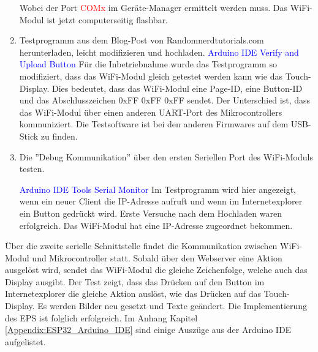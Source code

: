 \begin{enumerate}
Wobei der Port \textcolor{red}{COMx} im Geräte-Manager ermittelt werden muss. Das WiFi-Modul ist jetzt computerseitig flashbar.\newpage

\item Testprogramm aus dem Blog-Post von Randomnerdtutorials.com herunterladen, leicht modifizieren und hochladen. \cite{santos_esp32_2018}\newline
\textcolor{blue}{Arduino IDE \textrightarrow Verify and Upload Button} \newline
Für die Inbetriebnahme wurde das Testprogramm so modifiziert, dass das WiFi-Modul gleich getestet werden kann wie das Touch-Display. Dies bedeutet, dass das WiFi-Modul eine Page-ID, eine Button-ID und das Abschlusszeichen 0xFF 0xFF 0xFF sendet. Der Unterschied ist, dass das WiFi-Modul über einen anderen UART-Port des Mikrocontrollers kommuniziert. Die Testsoftware ist bei den anderen Firmwares auf dem USB-Stick zu finden.\newline

\item Die ''Debug Kommunikation'' über den ersten Seriellen Port des WiFi-Moduls testen.

\textcolor{blue}{Arduino IDE \textrightarrow Tools \textrightarrow Serial Monitor}\newline
Im Testprogramm wird hier angezeigt, wenn ein neuer Client die IP-Adresse aufruft und wenn im Internetexplorer ein Button gedrückt wird. Erste Versuche nach dem Hochladen waren erfolgreich. Das WiFi-Modul hat eine IP-Adresse zugeordnet bekommen.
\end{enumerate}

Über die zweite serielle Schnittstelle findet die Kommunikation zwischen WiFi-Modul und Mikrocontroller statt. Sobald über den Webserver eine Aktion ausgelöst wird, sendet das WiFi-Modul die gleiche Zeichenfolge, welche auch das Display ausgibt. Der Test zeigt, dass das Drücken auf den Button im Internetexplorer die gleiche Aktion auslöst, wie das Drücken auf das Touch-Display. Es werden Bilder neu gesetzt und Texte geändert. Die Implementierung des EPS ist folglich erfolgreich. Im Anhang Kapitel \ref{Appendix:ESP32_Arduino_IDE} sind einige Auszüge aus der Arduino IDE aufgelistet.